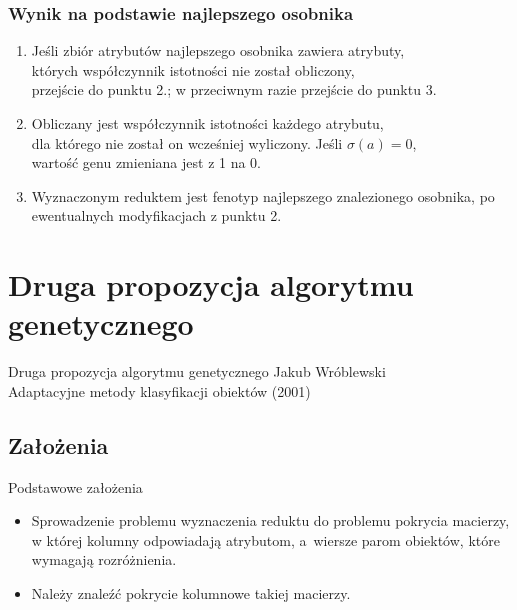 \documentclass[10pt]{beamer}
\begin{document}


\begin{frame}
\frametitle{Wynik na podstawie najlepszego osobnika}
\begin{spacing}{1.3}
\begin{flushleft}
\begin{enumerate}[1.]
\item Jeśli zbiór atrybutów najlepszego osobnika zawiera atrybuty,\\
których współczynnik istotności nie został obliczony,\\
przejście do punktu 2.; w przeciwnym razie przejście do punktu 3.
\item Obliczany jest współczynnik istotności każdego atrybutu,\\
dla którego nie został on wcześniej wyliczony. Jeśli $\sigma(a) = 0$,\\ wartość genu zmieniana jest z 1 na 0.
\item Wyznaczonym reduktem jest fenotyp najlepszego znalezionego osobnika, po ewentualnych modyfikacjach z punktu 2.
\end{enumerate}
\end{flushleft}
\end{spacing}

\end{frame}



\section{Druga propozycja algorytmu genetycznego}


\begin{frame}{Druga propozycja algorytmu genetycznego}
Jakub Wróblewski\\
\newblock Adaptacyjne metody klasyfikacji obiektów (2001)
\end{frame}

\subsection{Założenia}
\begin{frame}{Podstawowe założenia}
\begin{spacing}{1.5}
\begin{itemize}
\item Sprowadzenie problemu wyznaczenia reduktu do problemu pokrycia macierzy, w której kolumny odpowiadają atrybutom, a~wiersze parom obiektów, które wymagają rozróżnienia.
\item Należy znaleźć pokrycie kolumnowe takiej macierzy.
\end{itemize}
\end{spacing}
\end{frame}
\end{document}
